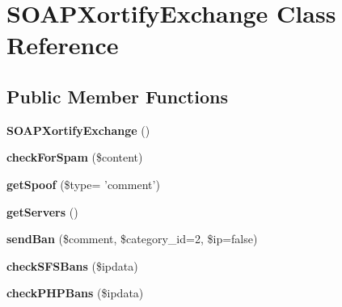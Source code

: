 \hypertarget{class_s_o_a_p_xortify_exchange}{\section{S\-O\-A\-P\-Xortify\-Exchange Class Reference}
\label{class_s_o_a_p_xortify_exchange}
}
\subsection*{Public Member Functions}
\begin{DoxyCompactItemize}
\item 
\hypertarget{class_s_o_a_p_xortify_exchange_aa822fb4cff3861c4caebee64ea8277a8}{{\bfseries S\-O\-A\-P\-Xortify\-Exchange} ()}\label{class_s_o_a_p_xortify_exchange_aa822fb4cff3861c4caebee64ea8277a8}

\item 
\hypertarget{class_s_o_a_p_xortify_exchange_acb733dd60506b066aae2078b724fe69e}{{\bfseries check\-For\-Spam} (\$content)}\label{class_s_o_a_p_xortify_exchange_acb733dd60506b066aae2078b724fe69e}

\item 
\hypertarget{class_s_o_a_p_xortify_exchange_ae8c876acf75f4c58f1d2e7b942d34b97}{{\bfseries get\-Spoof} (\$type= 'comment')}\label{class_s_o_a_p_xortify_exchange_ae8c876acf75f4c58f1d2e7b942d34b97}

\item 
\hypertarget{class_s_o_a_p_xortify_exchange_a12c6e726fee55c3a10986cb3b1623b6f}{{\bfseries get\-Servers} ()}\label{class_s_o_a_p_xortify_exchange_a12c6e726fee55c3a10986cb3b1623b6f}

\item 
\hypertarget{class_s_o_a_p_xortify_exchange_a89263300393fabde2fa3de91239befc1}{{\bfseries send\-Ban} (\$comment, \$category\-\_\-id=2, \$ip=false)}\label{class_s_o_a_p_xortify_exchange_a89263300393fabde2fa3de91239befc1}

\item 
\hypertarget{class_s_o_a_p_xortify_exchange_ac94438dbc78760c6f9585c0178003e19}{{\bfseries check\-S\-F\-S\-Bans} (\$ipdata)}\label{class_s_o_a_p_xortify_exchange_ac94438dbc78760c6f9585c0178003e19}

\item 
\hypertarget{class_s_o_a_p_xortify_exchange_ad6923b1bbbd98112d062e1ee7da2a4db}{{\bfseries check\-P\-H\-P\-Bans} (\$ipdata)}\label{class_s_o_a_p_xortify_exchange_ad6923b1bbbd98112d062e1ee7da2a4db}


\end{DoxyCompactItemize}
